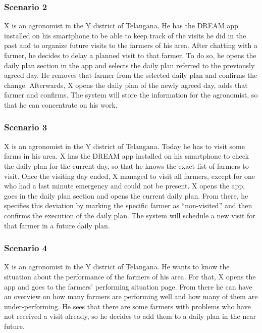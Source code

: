 \subsubsection*{Scenario 2}
X is an agronomist in the Y district of Telangana. He has the DREAM app installed on his smartphone to be able to keep track of the visits he did in the past and to organize future visits to the farmers of his area. After chatting with a farmer, he decides to delay a planned visit to that farmer. To do so, he opens the daily plan section in the app and selects the daily plan referred to the previously agreed day. He removes that farmer from the selected daily plan and confirms the change. Afterwards, X opens the daily plan of the newly agreed day, adds that farmer and confirms. The system will store the information for the agronomist, so that he can concentrate on his work.



\subsubsection*{Scenario 3}
X is an agronomist in the Y district of Telangana. Today he has to visit some farms in his area. X has the DREAM app installed on his smartphone to check the daily plan for the current day, so that he knows the exact list of farmers to visit. Once the visiting day ended, X managed to visit all farmers, except for one who had a last minute emergency and could not be present. X opens the app, goes in the daily plan section and opens the current daily plan. From there, he specifies this deviation by marking the specific farmer as “non-visited” and then confirms the execution of the daily plan. The system will schedule a new visit for that farmer in a future daily plan.

\subsubsection*{Scenario 4}
X is an agronomist in the Y district of Telangana. He wants to know the situation about the performance of the farmers of his area. For that, X opens the app and goes to the farmers’ performing situation page. From there he can have an overview on how many farmers are performing well and how many of them are under-performing. He sees that there are some farmers with problems who have not received a visit already, so he decides to add them to a daily plan in the near future.
